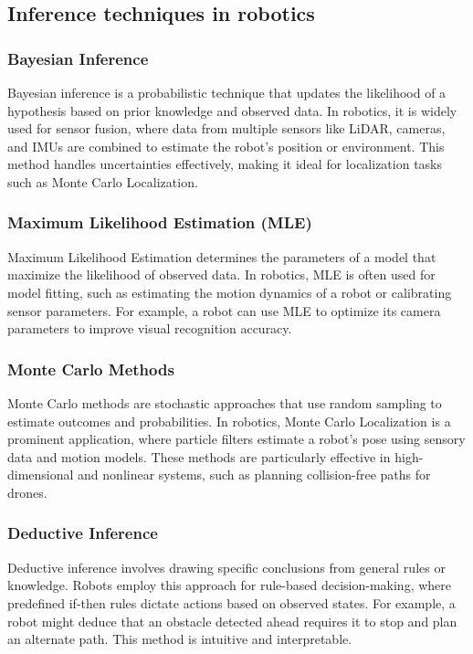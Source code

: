 \subsection{Inference techniques in robotics}

    \subsubsection{Bayesian Inference}
    Bayesian inference is a probabilistic technique that updates the likelihood of a hypothesis based on prior knowledge and observed data. In robotics, it is widely used for sensor fusion, where data from multiple sensors like LiDAR, cameras, and IMUs are combined to estimate the robot's position or environment. This method handles uncertainties effectively, making it ideal for localization tasks such as Monte Carlo Localization. 

    \subsubsection{Maximum Likelihood Estimation (MLE)}
    Maximum Likelihood Estimation determines the parameters of a model that maximize the likelihood of observed data. In robotics, MLE is often used for model fitting, such as estimating the motion dynamics of a robot or calibrating sensor parameters. For example, a robot can use MLE to optimize its camera parameters to improve visual recognition accuracy. 

    \subsubsection{Monte Carlo Methods}
    Monte Carlo methods are stochastic approaches that use random sampling to estimate outcomes and probabilities. In robotics, Monte Carlo Localization is a prominent application, where particle filters estimate a robot’s pose using sensory data and motion models. These methods are particularly effective in high-dimensional and nonlinear systems, such as planning collision-free paths for drones. 

    \subsubsection{Deductive Inference}
    Deductive inference involves drawing specific conclusions from general rules or knowledge. Robots employ this approach for rule-based decision-making, where predefined if-then rules dictate actions based on observed states. For example, a robot might deduce that an obstacle detected ahead requires it to stop and plan an alternate path. This method is intuitive and interpretable. 

